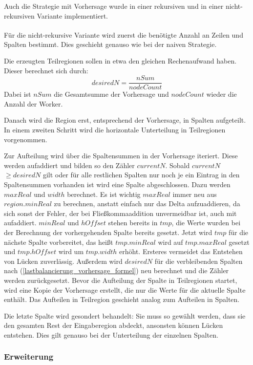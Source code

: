 Auch die Strategie mit Vorhersage wurde in einer rekursiven und in einer nicht-rekursiven Variante implementiert.

\paragraph*{}
Für die nicht-rekursive Variante wird zuerst die benötigte Anzahl an Zeilen und Spalten bestimmt.
Dies geschieht genauso wie bei der naiven Strategie.

Die erzeugten Teilregionen sollen in etwa den gleichen Rechenaufwand haben. Dieser berechnet sich durch:
\begin{equation} \label{lastbalancierung_vorhersage_formel}
	desiredN = \frac{nSum}{nodeCount}
\end{equation}
Dabei ist $nSum$ die Gesamtsumme der Vorhersage und $nodeCount$ wieder die Anzahl der Worker.

Danach wird die Region erst, entsprechend der Vorhersage, in Spalten aufgeteilt. In einem zweiten Schritt wird die horizontale Unterteilung in Teilregionen vorgenommen. 

Zur Aufteilung wird über die Spaltensummen in der Vorhersage iteriert. Diese werden aufaddiert und bilden so den Zähler $currentN$.
Sobald $currentN$ $\geq desiredN$ gilt oder für alle restlichen Spalten nur noch je ein Eintrag in den Spaltensummen vorhanden ist wird eine Spalte abgeschlossen.
Dazu werden $maxReal$ und $width$ berechnet. Es ist wichtig $maxReal$ immer neu aus $region.minReal$ zu berechnen, anstatt einfach nur das Delta aufzuaddieren, da sich sonst der Fehler, der bei Fließkommaaddition unvermeidbar ist, auch mit aufaddiert. $minReal$ und $hOffset$ stehen bereits in $tmp$, die Werte wurden bei der Berechnung der vorhergehenden Spalte bereits gesetzt.
Jetzt wird $tmp$ für die nächste Spalte vorbereitet, das heißt $tmp.minReal$ wird auf $tmp.maxReal$ gesetzt und $tmp.hOffset$ wird um $tmp.width$ erhöht. Ersteres vermeidet das Entstehen von Lücken zuverlässig.
Außerdem wird $desiredN$ für die verbleibenden Spalten nach (\ref{lastbalancierung_vorhersage_formel}) neu berechnet und die Zähler werden zurückgesetzt.
Bevor die Aufteilung der Spalte in Teilregionen startet, wird eine Kopie der Vorhersage erstellt, die nur die Werte für die aktuelle Spalte enthält.
Das Aufteilen in Teilregion geschieht analog zum Aufteilen in Spalten.

Die letzte Spalte wird gesondert behandelt: Sie muss so gewählt werden, dass sie den gesamten Rest der Eingaberegion abdeckt, ansonsten können Lücken entstehen.
Dies gilt genauso bei der Unterteilung der einzelnen Spalten.

\paragraph*{}

\subsubsection{Erweiterung} \label{lastbalancierung_erweiterung}